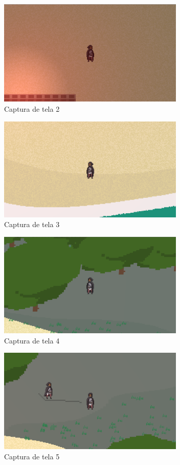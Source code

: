 \documentclass[12pt, 
openright, 
oneside, 
a4paper,    
brazil]{facom-ufu-abntex2}
\begin{document}
\begin{figure}[H]
	\centering
	\includegraphics[width=24em]{imagens/ss2.png}
	\caption{Captura de tela 2}
\end{figure}
\begin{figure}[H]
	\centering
	\includegraphics[width=24em]{imagens/ss3.png}
	\caption{Captura de tela 3}
\end{figure}
\begin{figure}[H]
	\centering
	\includegraphics[width=24em]{imagens/ss4.png}
	\caption{Captura de tela 4}
\end{figure}
\begin{figure}[H]
	\centering
	\includegraphics[width=24em]{imagens/ss5.png}
	\caption{Captura de tela 5}
\end{figure}
\end{document}
